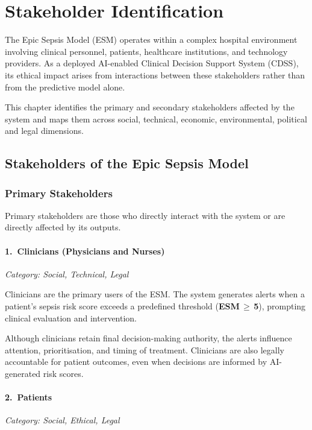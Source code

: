 \documentclass[]{UCD_CS_41820_Report}
\begin{document}
\chapter{Stakeholder Identification}

The Epic Sepsis Model (ESM) operates within a complex hospital environment involving
clinical personnel, patients, healthcare institutions, and technology providers.
As a deployed AI-enabled Clinical Decision Support System (CDSS), its ethical impact
arises from interactions between these stakeholders rather than from the predictive
model alone.

This chapter identifies the primary and secondary stakeholders affected by the system
and maps them across social, technical, economic, environmental, political and legal
dimensions.

\vspace{-8pt}
\section{Stakeholders of the Epic Sepsis Model}

\subsection*{Primary Stakeholders}

Primary stakeholders are those who directly interact with the system or are directly
affected by its outputs.

\subsubsection*{1.\ Clinicians (Physicians and Nurses)}
\textit{Category: Social, Technical, Legal}

Clinicians are the primary users of the ESM. The system generates alerts when a
patient's sepsis risk score exceeds a predefined threshold (\textbf{ESM\,$\geq$\,5}),
prompting clinical evaluation and intervention.

Although clinicians retain final decision-making authority, the alerts influence
attention, prioritisation, and timing of treatment. Clinicians are also legally
accountable for patient outcomes, even when decisions are informed by AI-generated
risk scores.

\subsubsection*{2.\ Patients}
\textit{Category: Social, Ethical, Legal}
\end{document}
